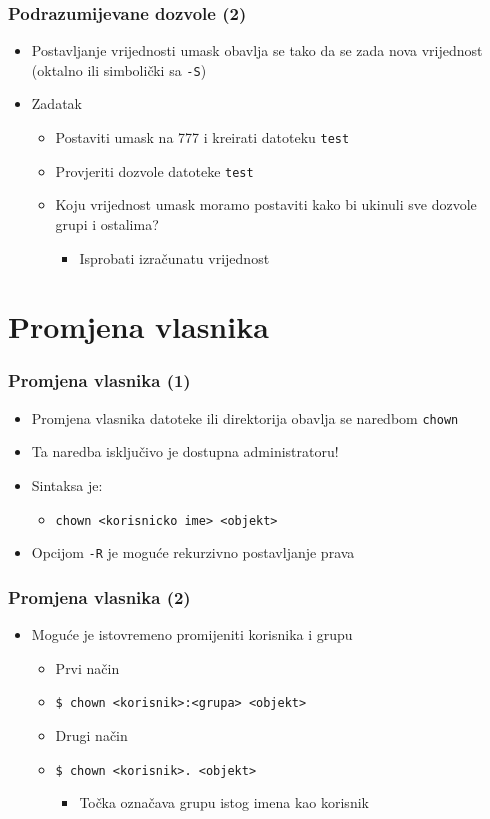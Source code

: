\documentclass[table,usenames,dvipsnames]{beamer}
\newcommand{\shell}[1]{\texttt{#1}}
\begin{document}
\begin{frame}[t]
\frametitle{Podrazumijevane dozvole (2)}
\begin{itemize}
  \item Postavljanje vrijednosti umask obavlja se tako da se zada nova 
        vrijednost (oktalno ili simbolički sa \shell{-S})
  \item Zadatak
  \begin{itemize}
    \item Postaviti umask na 777 i kreirati datoteku \shell{test}
    \item Provjeriti dozvole datoteke \shell{test}
    \item Koju vrijednost umask moramo postaviti kako bi ukinuli sve 
          dozvole grupi i ostalima? 
    \begin{itemize}
      \item Isprobati izračunatu vrijednost
    \end{itemize}
  \end{itemize}
\end{itemize}
\end{frame}

\section{Promjena vlasnika}
\begin{frame}[t]
\frametitle{Promjena vlasnika (1)}
\begin{itemize}
  \item Promjena vlasnika datoteke ili direktorija obavlja se naredbom 
        \shell{chown}
  \item Ta naredba isključivo je dostupna administratoru!
  \item Sintaksa je:
  \begin{itemize}
    \item[] \shell{chown <korisnicko ime> <objekt>}
  \end{itemize}
  \item Opcijom \shell{-R} je moguće rekurzivno postavljanje prava
\end{itemize}
\end{frame}

\begin{frame}[t]
\frametitle{Promjena vlasnika (2)}
\begin{itemize}
  \item Moguće je istovremeno promijeniti korisnika i grupu
  \begin{itemize}
    \item Prvi način
    \item[] \shell{\$ chown <korisnik>:<grupa>  <objekt>}
    \item Drugi način
    \item[] \shell{\$ chown <korisnik>.  <objekt>}
    \begin{itemize}
      \item Točka označava grupu istog imena kao korisnik 
    \end{itemize}
  \end{itemize}
\end{itemize}
\end{frame}
\end{document}
